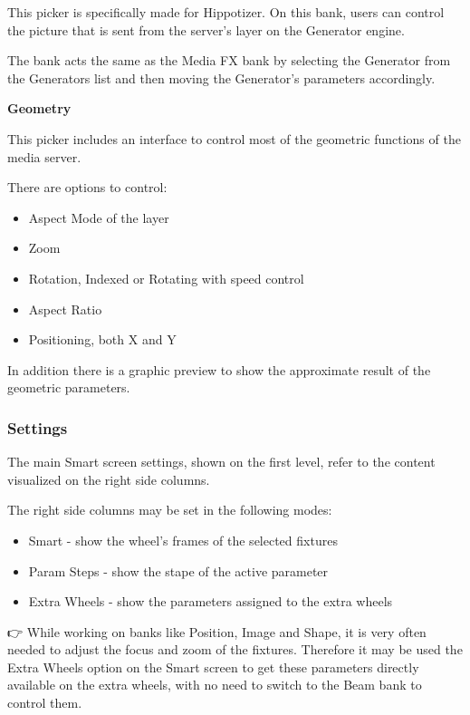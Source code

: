 \documentclass[
]{article}
\begin{document}
This picker is specifically made for Hippotizer. On this bank, users can control the picture that is sent from the server's layer on the Generator engine.

The bank acts the same as the Media FX bank by selecting the Generator from the Generators list and then moving the Generator's parameters accordingly.

\textbf{Geometry}

This picker includes an interface to control most of the geometric functions of the media server.

There are options to control:

\begin{itemize}
\item
  Aspect Mode of the layer
\item
  Zoom
\item
  Rotation, Indexed or Rotating with speed control
\item
  Aspect Ratio
\item
  Positioning, both X and Y
\end{itemize}

In addition there is a graphic preview to show the approximate result of the geometric parameters.

\hypertarget{settings-1}{%
\subsubsection{Settings}\label{settings-1}}

The main Smart screen settings, shown on the first level, refer to the content visualized on the right side columns.

The right side columns may be set in the following modes:

\begin{itemize}
\item
  Smart - show the wheel's frames of the selected fixtures
\item
  Param Steps - show the stape of the active parameter
\item
  Extra Wheels - show the parameters assigned to the extra wheels
\end{itemize}

👉 While working on banks like Position, Image and Shape, it is very often needed to adjust the focus and zoom of the fixtures. Therefore it may be used the Extra Wheels option on the Smart screen to get these parameters directly available on the extra wheels, with no need to switch to the Beam bank to control them.
\end{document}
